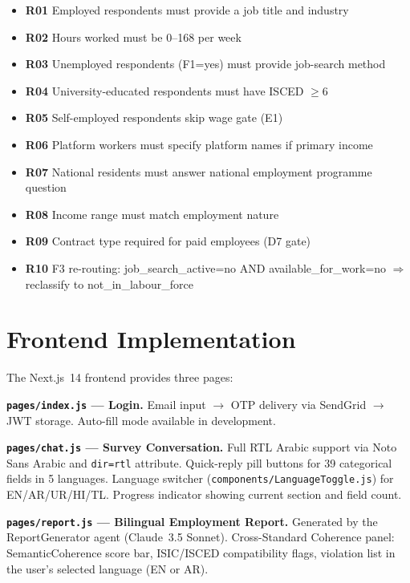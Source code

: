 \begin{itemize}
  \item \textbf{R01} Employed respondents must provide a job title and industry
  \item \textbf{R02} Hours worked must be 0--168 per week
  \item \textbf{R03} Unemployed respondents (F1=yes) must provide job-search
  method
  \item \textbf{R04} University-educated respondents must have ISCED $\geq$6
  \item \textbf{R05} Self-employed respondents skip wage gate (E1)
  \item \textbf{R06} Platform workers must specify platform names if primary
  income
  \item \textbf{R07} National residents must answer national employment programme question
  \item \textbf{R08} Income range must match employment nature
  \item \textbf{R09} Contract type required for paid employees (D7 gate)
  \item \textbf{R10} F3 re-routing: job\_search\_active=no AND
  available\_for\_work=no $\Rightarrow$ reclassify to not\_in\_labour\_force
\end{itemize}

\section{Frontend Implementation}
\label{sec:impl-frontend}

The Next.js~14 frontend provides three pages:

\textbf{\texttt{pages/index.js} --- Login.}
Email input $\to$ OTP delivery via SendGrid $\to$ JWT storage.
Auto-fill mode available in development.

\textbf{\texttt{pages/chat.js} --- Survey Conversation.}
Full RTL Arabic support via Noto Sans Arabic and \texttt{dir=rtl} attribute.
Quick-reply pill buttons for 39 categorical fields in 5 languages.
Language switcher (\texttt{components/\-LanguageToggle.\-js}) for EN/AR/UR/HI/TL.
Progress indicator showing current section and field count.

\textbf{\texttt{pages/report.js} --- Bilingual Employment Report.}
Generated by the ReportGenerator agent (Claude~3.5 Sonnet).
Cross-Standard Coherence panel: SemanticCoherence score bar, ISIC/ISCED
compatibility flags, violation list in the user's selected language (EN or AR).

